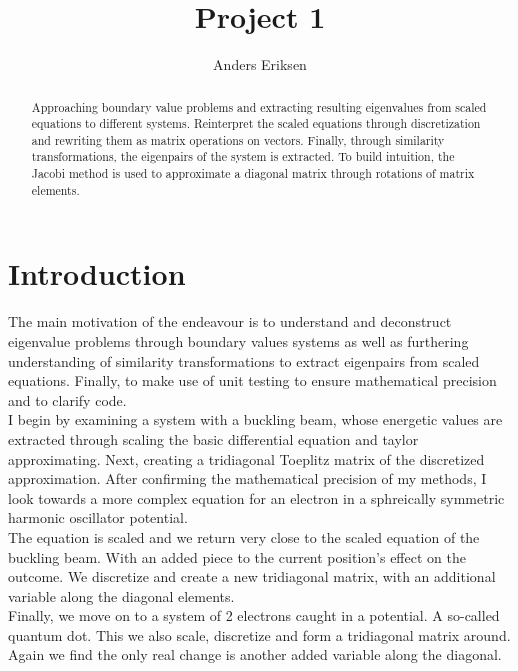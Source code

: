 \documentclass[10pt, twocolumn]{article}
\begin{document}
\title{Project 1}
\author{Anders Eriksen}

\maketitle

\begin{abstract}
    Approaching boundary value problems and extracting resulting eigenvalues from scaled 
    equations to different systems. Reinterpret the scaled equations through
    discretization and rewriting them as matrix operations on vectors. Finally, through
    similarity transformations, the eigenpairs of the system is extracted. To build
    intuition, the Jacobi method is used to approximate a diagonal matrix through 
    rotations of matrix elements.

\end{abstract}

\section{Introduction}
The main motivation of the endeavour is to understand and deconstruct eigenvalue problems through
boundary values systems as well as furthering understanding of similarity transformations to extract
eigenpairs from scaled equations. Finally, to make use of unit testing to ensure mathematical 
precision and to clarify code.\\

I begin by examining a system with a buckling beam, whose energetic values are extracted through 
scaling the basic differential equation and taylor approximating. Next, creating a tridiagonal 
Toeplitz matrix of the discretized approximation. After confirming the mathematical precision of my 
methods, I look towards a more complex equation for an electron in a sphreically symmetric harmonic
oscillator potential.\\
The equation is scaled and we return very close to the scaled equation of the
buckling beam. With an added piece to the current position's effect on the outcome. We discretize and 
create a new tridiagonal matrix, with an additional variable along the diagonal elements.\\
Finally, we move on to a system of 2 electrons caught in a potential. A so-called quantum dot. This we 
also scale, discretize and form a tridiagonal matrix around. Again we find the only real change is another added
variable along the diagonal. 
\end{document}
